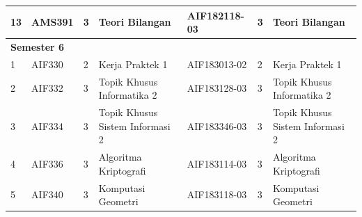 \begin{table}[H]
\begin{tabular}{|p{0.35cm}|p{2cm}|p{0.55cm}|p{3.45cm}|p{2.65cm}|p{0.55cm}|p{3.45cm}|}
13 & AMS391 & 3 & Teori Bilangan                   & AIF182118-03 & 3 & Teori Bilangan                   \\ \hline
\multicolumn{7}{|l|}{\textbf{Semester 6}}        \\ \hline
1  & AIF330  &  2 & Kerja Praktek 1                  & AIF183013-02 & 2 & Kerja Praktek 1                  \\ \hline
2  & AIF332  &  3 & Topik Khusus Informatika 2       & AIF183128-03 & 3 & Topik Khusus Informatika 2       \\ \hline
3  & AIF334 & 3   & Topik Khusus Sistem Informasi 2  & AIF183346-03 & 3 & Topik Khusus Sistem Informasi 2  \\ \hline
4  & AIF336  &  3 & Algoritma Kriptografi            & AIF183114-03 & 3 & Algoritma Kriptografi            \\ \hline
5  & AIF340  & 3  & Komputasi Geometri               & AIF183118-03 & 3 & Komputasi Geometri               \\ \hline
\end{tabular}
\end{table}

